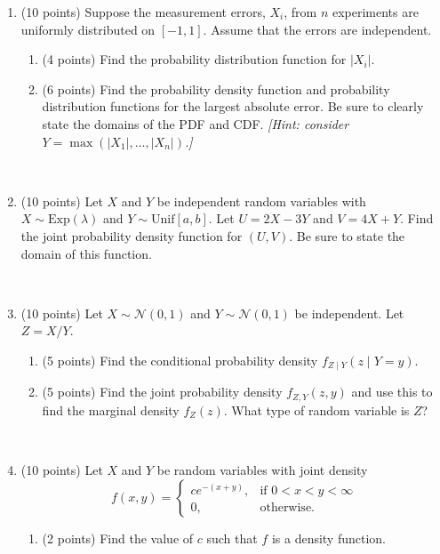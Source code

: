 \documentclass[11pt]{article}
\theoremstyle{plain}
\newcommand{\Unif}{\ensuremath{\textrm{Unif}}}
\newcommand{\Exp}{\ensuremath{\textrm{Exp}}}
\begin{document}
\begin{enumerate}
    \item (10 points)
    Suppose the measurement errors, $X_i$, from $n$ experiments are uniformly distributed on $[-1, 1]$.
    Assume that the errors are independent.
    \begin{enumerate}
        \item (4 points)
        Find the probability distribution function for $|X_i|$.

        \vfill

        \item (6 points)
        Find the probability density function and probability distribution functions for the largest absolute error.
        Be sure to clearly state the domains of the PDF and CDF.
        \emph{[Hint: consider $Y = \max(|X_1|, \ldots, |X_n|)$.]}

        \vfill
    \end{enumerate}

    \newpage
    \ 
    \newpage

    \item (10 points)
    Let $X$ and $Y$ be independent random variables with $X\sim \Exp(\lambda)$ and $Y\sim \Unif [a,b]$.
    Let $U = 2X-3Y$ and $V = 4X+Y$.
    Find the joint probability density function for $(U, V)$.
    Be sure to state the domain of this function.

    \newpage
    \ 
    \newpage

    \item (10 points)
    Let $X\sim \mathcal{N}(0, 1)$ and $Y\sim \mathcal{N}(0, 1)$ be independent.
    Let $Z = X/Y$.
    \begin{enumerate}
    \item (5 points)
    Find the conditional probability density $f_{Z\mid Y}(z\mid Y=y)$.
    \vfill

    \item (5 points)
    Find the joint probability density $f_{Z, Y}(z, y)$ and use this to find the marginal density $f_Z(z)$.
    What type of random variable is $Z$?
    \vfill

    \end{enumerate}

    \newpage
    \ 
    \newpage

    \item (10 points)
    Let $X$ and $Y$ be random variables with joint density
    \[
        f(x,y) = \begin{cases}
            ce^{-(x+y)},&\text{if }0<x<y<\infty\\
            0,&\text{otherwise.}
        \end{cases}
    \]
    \begin{enumerate}
        \item (2 points)
        Find the value of $c$ such that $f$ is a density function.


\end{enumerate}
\end{enumerate}
\end{document}
